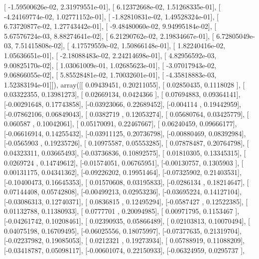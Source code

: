 \documentclass{article}
\begin{document}
       [ -1.59500626e-02,   2.31979551e-01],
       [  6.12372668e-02,   1.51268335e-01],
       [ -4.24169774e-02,   1.02771152e-01],
       [ -1.82810831e-02,   1.49528324e-01],
       [  6.73720877e-02,   1.27743442e-01],
       [ -9.48480060e-02,   9.94995184e-02],
       [  5.67576724e-03,   8.88274641e-02],
       [  6.21290762e-02,   2.19834667e-01],
       [  6.72805049e-03,   7.51415808e-02],
       [  4.17579559e-02,   1.50866148e-01],
       [  1.82240416e-02,   1.05636651e-01],
       [ -2.18088483e-02,   2.24214698e-01],
       [  4.82956592e-03,   9.00825170e-02],
       [  1.03061009e-01,   1.02685623e-01],
       [ -3.07017943e-02,   9.06866055e-02],
       [  5.85528481e-02,   1.70032601e-01],
       [ -4.35818883e-03,   1.52383194e-01]]), array([[ 0.09439451,  0.20211055],
       [ 0.02850435,  0.1118028 ],
       [ 0.03322355,  0.13981273],
       [ 0.02669134,  0.0424366 ],
       [ 0.07694883,  0.09364141],
       [-0.00291648,  0.17743858],
       [-0.03923066,  0.22689452],
       [-0.004114  ,  0.19442959],
       [-0.07862106,  0.06849043],
       [ 0.0382719 ,  0.12053274],
       [ 0.05680764,  0.03425779],
       [ 0.060587  ,  0.10042061],
       [ 0.05170091,  0.22467667],
       [ 0.06240459,  0.09666177],
       [-0.06616914,  0.14255432],
       [-0.03911125,  0.20736798],
       [-0.00880469,  0.08392984],
       [-0.0565903 ,  0.19235726],
       [ 0.10975587,  0.05553285],
       [ 0.07878487,  0.20764798],
       [ 0.04323311,  0.03665493],
       [-0.03736836,  0.10892575],
       [ 0.01810305,  0.13345315],
       [ 0.0269724 ,  0.14749612],
       [-0.01574051,  0.06765951],
       [-0.00130757,  0.1305903 ],
       [ 0.00131175,  0.04341362],
       [-0.09226202,  0.19951464],
       [-0.07325902,  0.21403531],
       [-0.10400473,  0.16645353],
       [ 0.01570608,  0.03195833],
       [-0.0286134 ,  0.18214647],
       [ 0.07144408,  0.05742808],
       [-0.00499213,  0.02953236],
       [-0.03695224,  0.14127104],
       [-0.03086313,  0.12740371],
       [ 0.0836815 ,  0.12495294],
       [-0.0587427 ,  0.12522385],
       [ 0.01132788,  0.11380933],
       [ 0.0777701 ,  0.20094985],
       [ 0.00971795,  0.1153467 ],
       [-0.04261742,  0.10208461],
       [ 0.02390935,  0.05866489],
       [ 0.02103813,  0.10070494],
       [ 0.04075198,  0.16709495],
       [-0.06025556,  0.18075997],
       [-0.07377635,  0.21319704],
       [-0.02237982,  0.19085053],
       [ 0.0212321 ,  0.19273934],
       [ 0.05788919,  0.11088209],
       [-0.03418787,  0.05098117],
       [-0.00601074,  0.22150933],
       [-0.06324959,  0.0295737 ],
\end{document}
